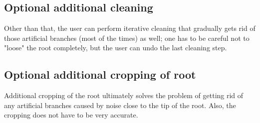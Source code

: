 \subsection{Optional additional cleaning}

Other than that, the user can perform iterative cleaning that gradually gets rid of those artificial branches (most of the times) as well; one has to be careful not to "loose" the root completely, but the user can undo the last cleaning step. 

\subsection{Optional additional cropping of root}

Additional cropping of the root ultimately solves the problem of getting rid of any artificial branches caused by noise close to the tip of the root.
Also, the cropping does not have to be very accurate.



%
%
%
%
%
%


